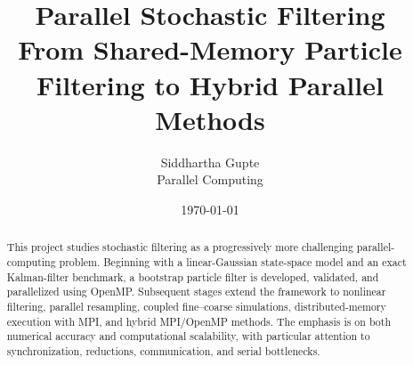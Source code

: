 \documentclass[11pt]{article}
\title{
	\textbf{Parallel Stochastic Filtering}\\[0.4em]
	\large From Shared-Memory Particle Filtering to Hybrid Parallel Methods
}
\author{
	Siddhartha Gupte\\
	Parallel Computing
}
\date{\today}
\begin{document}
	
	\maketitle
	
	\begin{abstract}
		
		This project studies stochastic filtering as a progressively more
		challenging parallel-computing problem. Beginning with a linear-Gaussian
		state-space model and an exact Kalman-filter benchmark, a bootstrap
		particle filter is developed, validated, and parallelized using OpenMP.
		Subsequent stages extend the framework to nonlinear filtering, parallel
		resampling, coupled fine--coarse simulations, distributed-memory
		execution with MPI, and hybrid MPI/OpenMP methods. The emphasis is on
		both numerical accuracy and computational scalability, with particular
		attention to synchronization, reductions, communication, and serial
		bottlenecks.
		
	\end{abstract}
	
	\tableofcontents
	\newpage
	
	
	
	
	
	
	\newpage
	
	
	
	
	
	
	
	
	
	
\end{document}
